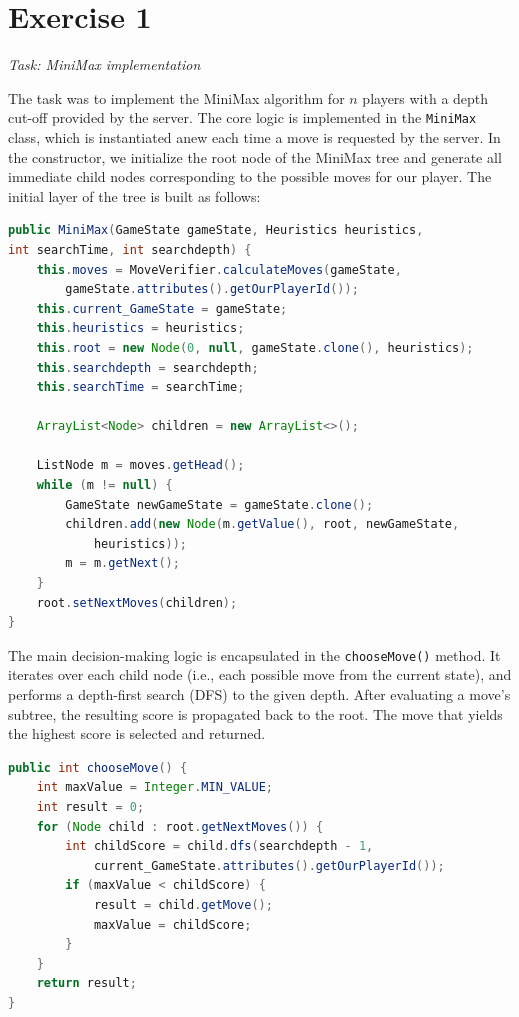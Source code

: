 \section*{Exercise 1}
\textit{Task: MiniMax implementation}

\noindent The task was to implement the MiniMax algorithm for $n$ players with a depth cut-off provided by the server. The core logic is implemented in the \texttt{MiniMax} class, which is instantiated anew each time a move is requested by the server. In the constructor, we initialize the root node of the MiniMax tree and generate all immediate child nodes corresponding to the possible moves for our player. The initial layer of the tree is built as follows:

\begin{lstlisting}[language=Java,basicstyle=\ttfamily\small]
public MiniMax(GameState gameState, Heuristics heuristics, 
int searchTime, int searchdepth) {
    this.moves = MoveVerifier.calculateMoves(gameState, 
        gameState.attributes().getOurPlayerId());
    this.current_GameState = gameState;
    this.heuristics = heuristics;
    this.root = new Node(0, null, gameState.clone(), heuristics);
    this.searchdepth = searchdepth;
    this.searchTime = searchTime;

    ArrayList<Node> children = new ArrayList<>();

    ListNode m = moves.getHead();
    while (m != null) {
        GameState newGameState = gameState.clone();
        children.add(new Node(m.getValue(), root, newGameState, 
            heuristics));
        m = m.getNext();
    }
    root.setNextMoves(children);
}
\end{lstlisting}

\noindent The main decision-making logic is encapsulated in the \texttt{chooseMove()} method. It iterates over each child node (i.e., each possible move from the current state), and performs a depth-first search (DFS) to the given depth. After evaluating a move's subtree, the resulting score is propagated back to the root. The move that yields the highest score is selected and returned.

\begin{lstlisting}[language=Java,basicstyle=\ttfamily\small]
public int chooseMove() {
    int maxValue = Integer.MIN_VALUE;
    int result = 0;
    for (Node child : root.getNextMoves()) {
        int childScore = child.dfs(searchdepth - 1, 
            current_GameState.attributes().getOurPlayerId());
        if (maxValue < childScore) {
            result = child.getMove();
            maxValue = childScore;
        }
    }
    return result;
}
\end{lstlisting}

